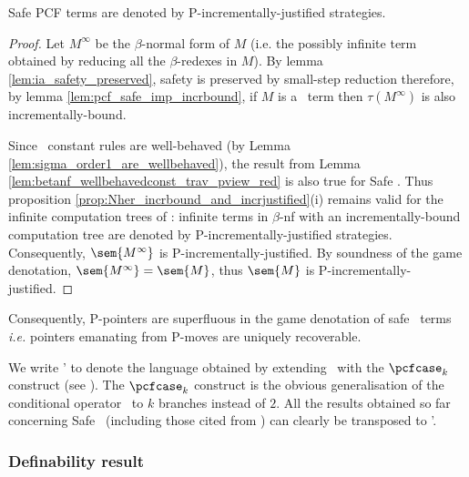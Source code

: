 \begin{theorem}
Safe PCF terms are denoted by P-incrementally-justified strategies.
\end{theorem}
\begin{proof}
Let $M^{\infty}$ be the $\beta$-normal form of $M$ (i.e. the possibly infinite term obtained by reducing all the $\beta$-redexes in $M$). By lemma \ref{lem:ia_safety_preserved}, safety is preserved by small-step reduction therefore, by lemma \ref{lem:pcf_safe_imp_incrbound}, if $M$ is a \pcf\ term then $\tau(M^{\infty})$ is also
incrementally-bound.

Since \pcf\ constant rules are well-behaved (by Lemma
\ref{lem:sigma_order1_are_wellbehaved}), the result from Lemma
\ref{lem:betanf_wellbehavedconst_trav_pview_red} is also true for
Safe \pcf. Thus proposition
\ref{prop:Nher_incrbound_and_incrjustified}(i) remains valid for the
infinite computation trees of \pcf: infinite terms in $\beta$-nf
with an incrementally-bound computation tree are denoted by
P-incrementally-justified strategies. Consequently,
$\sem{M^{\infty}}$ is P-incrementally-justified. By soundness of the
game denotation, $\sem{M^{\infty}} = \sem{M}$, thus $\sem{M}$ is
P-incrementally-justified.
\end{proof}

Consequently, P-pointers are superfluous in the game denotation of safe \pcf\ terms {\it i.e.} pointers emanating from P-moves are uniquely recoverable.

We write \pcf' to denote the language obtained by extending \pcf\
with the $\pcfcase_k$ construct (see \cite{Abr02}).
The $\pcfcase_k$ construct is the obvious generalisation of the
conditional operator \pcfcond\ to $k$ branches instead of $2$. All the results obtained so far concerning Safe \pcf\ (including those
cited from \cite{blumtransfer}) can clearly be transposed to \pcf'.

\subsubsection{Definability result}

